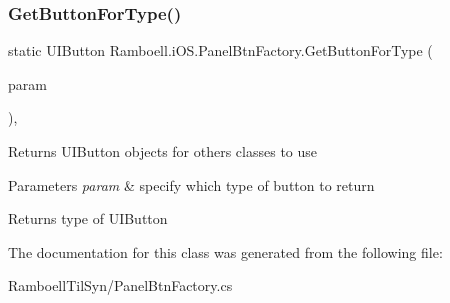 \subsubsection{\texorpdfstring{Get\+Button\+For\+Type()}{GetButtonForType()}}
{\footnotesize\ttfamily static U\+I\+Button Ramboell.\+i\+O\+S.\+Panel\+Btn\+Factory.\+Get\+Button\+For\+Type (\begin{DoxyParamCaption}\item[{Btn\+Type}]{param }\end{DoxyParamCaption})\hspace{0.3cm}{\ttfamily [inline]}, {\ttfamily [static]}}



Returns U\+I\+Button objects for others classes to use 


\begin{DoxyParams}{Parameters}
{\em param} & specify which type of button to return\\
\hline
\end{DoxyParams}
\begin{DoxyReturn}{Returns}
type of U\+I\+Button
\end{DoxyReturn}


The documentation for this class was generated from the following file\+:\begin{DoxyCompactItemize}
\item 
Ramboell\+Til\+Syn/Panel\+Btn\+Factory.\+cs\end{DoxyCompactItemize}
